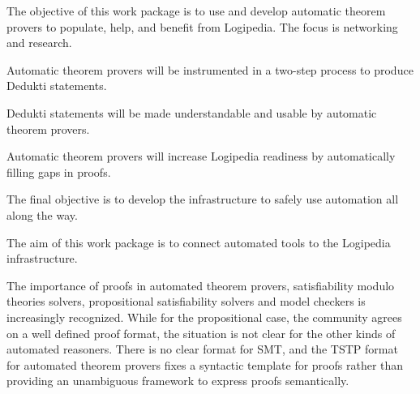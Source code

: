 \begin{workpackage}[id=atpetc,type=RTD,wphases=1-48,
  short={Automatic theorem provers},%
  title={Automatic theorem provers},
  lead=Sac,
  LieRM=54,%
  InnRM=6,
  BelRM=12,
  SacRM=9,%
  ImtRM=9,%
  OcaRM=14,
  CeaRM=18,
  StuRM=2]%


\begin{wpobjectives}
  The objective of this work package is to use and develop automatic
  theorem provers to populate, help, and benefit from Logipedia. The
  focus is networking and research.
  \begin{compactitem}
  \item Automatic theorem provers will be instrumented in a two-step
    process to produce Dedukti statements.
  \item Dedukti statements will be made understandable and usable by
    automatic theorem provers.
  \item Automatic theorem provers will increase Logipedia readiness by
    automatically filling gaps in proofs.
  \end{compactitem}
  The final objective is to develop the infrastructure to safely use automation
  all along the way.
\end{wpobjectives}


\begin{wpdescription}

  The aim of this work package is to connect automated tools to the Logipedia
  infrastructure.


The importance of proofs in automated theorem provers, satisfiability
modulo theories solvers, propositional satisfiability solvers and
model checkers is increasingly recognized.  While for the
propositional case, the community agrees on a well defined proof
format, the situation is not clear for the other kinds of automated
reasoners.  There is no clear format for SMT, and the TSTP format for
automated theorem provers fixes a syntactic template for proofs rather
than providing an unambiguous framework to express proofs
semantically.


\end{wpdescription}
\end{workpackage}
